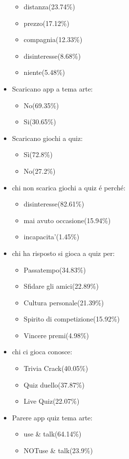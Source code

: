 \documentclass{article}
\begin{document}
\begin{itemize}
\begin{itemize}
	\item distanza(23.74\%)
	\item prezzo(17.12\%)
	\item compagnia(12.33\%)
	\item disinteresse(8.68\%)
	\item niente(5.48\%)
	\end{itemize}
\item Scaricano app a tema arte:
	\begin{itemize}
	\item No(69.35\%)
	\item Si(30.65\%)
	\end{itemize}
\item Scaricano giochi a quiz:
	\begin{itemize}
	\item Sì(72.8\%)
	\item No(27.2\%)
	\end{itemize}
\item chi non scarica giochi a quiz é perché:
	\begin{itemize}
	\item disinteresse(82.61\%)
	\item mai avuto occasione(15.94\%)
	\item incapacita'(1.45\%)
	\end{itemize}
\item chi ha risposto si gioca a quiz per:
	\begin{itemize}
	\item Passatempo(34.83\%)
	\item Sfidare gli amici(22.89\%)
	\item Cultura personale(21.39\%)
	\item Spirito di competizione(15.92\%)
	\item Vincere premi(4.98\%)
	\end{itemize}
\item chi ci gioca conosce:
	\begin{itemize}
	\item Trivia Crack(40.05\%)
	\item Quiz duello(37.87\%)
	\item Live Quiz(22.07\%)
	\end{itemize}
\item Parere app quiz tema arte:
	\begin{itemize}
	\item use \& talk(64.14\%)
	\item NOTuse \& talk(23.9\%)

\end{itemize}
\end{itemize}
\end{document}
